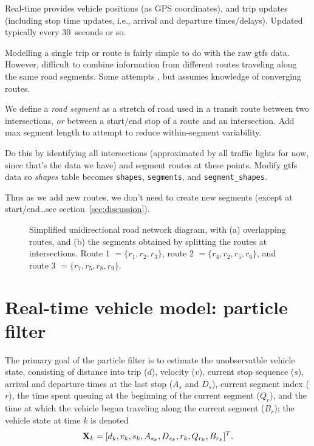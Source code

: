 \documentclass[draftcls,a4paper,onecolumn]{IEEEtran}\usepackage[]{graphicx}\usepackage[]{color}
\newenvironment{knitrout}{}{} %
\begin{document}
Real-time provides vehicle positions (as GPS coordinates),
and trip updates (including stop time updates, i.e., arrival and departure times/delays).
Updated typically every 30~seconds or so.

Modelling a single trip or route is fairly simple to do with the raw \gls{gtfs} data.
However, difficult to combine information from different routes traveling along the same road segments.
Some attempts \cite{Yu_2011}, but assumes knowledge of converging routes.

We define a \emph{road segment} as a stretch of road used in a transit route between two intersections,
\emph{or} between a start/end stop of a route and an intersection.
Add max segment length to attempt to reduce within-segment variability.

Do this by identifying all intersections
(approximated by all traffic lights for now, since that's the data we have)
and segment routes at these points.
Modify \gls{gtfs} data so \emph{shapes} table becomes
\texttt{shapes}, \texttt{segments}, and \texttt{segment\_shapes}.

Thus as we add new routes, we don't need to create new segments
(except at start/end\ldots see section~\ref{sec:discussion}).


\begin{knitrout}
\color{fgcolor}\begin{figure}
\caption[Simplied diagram of overlapping routes]{Simplified unidirectional road network diagram, with (a) overlapping routes, and (b) the segments obtained by splitting the routes at intersections. Route 1 $ = \{r_1, r_2, r_3\}$, route 2 $=\{r_4,r_2,r_5,r_6\}$, and route 3 $=\{r_7,r_5,r_8,r_9\}$.}\label{fig:route_segmentation}
\end{figure}


\end{knitrout}



\section{Real-time vehicle model: particle filter}
\label{sec:pf}

The primary goal of the particle filter is to estimate the unobservatble
vehicle state,
consisting of distance into trip ($d$), velocity ($v$),
current stop sequence ($s$), 
arrival and departure times at the last stop ($A_s$ and $D_s$),
current segment index ($r$),
the time spent queuing at the beginning of the current segment ($Q_r$),
and the time at which the vehicle began traveling along the current segment ($B_r$);
the vehicle state at time $k$ is denoted
\begin{equation}
  \label{eq:vehiclestate}
  \mathbf{X}_k = [d_k, v_k, s_k, A_{s_k}, D_{s_k}, r_k, Q_{r_k}, B_{r_k}]^T.
\end{equation}
\end{document}
